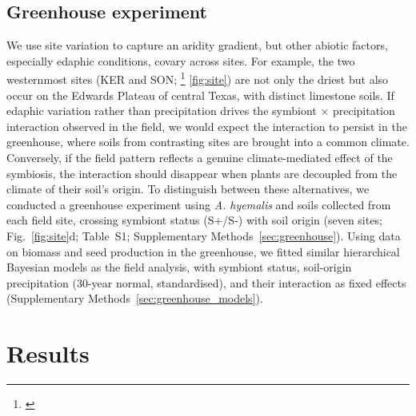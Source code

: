 \documentclass[12pt]{article}\usepackage[]{graphicx}\usepackage[dvipsnames]{xcolor}
\newcommand{\tom}[2]{{\color{red}{#1}}\footnote{\textit{\color{red}{#2}}}}
\begin{document}
\subsection*{Greenhouse experiment}
We use site variation to capture an aridity gradient, but other abiotic factors, especially edaphic conditions, covary across sites. 
For example, the two westernmost sites (KER and SON; \tom{Figure}{Sometimes you spell this out and sometimes it is Fig.} \ref{fig:site}) are not only the driest but also occur on the Edwards Plateau of central Texas, with distinct limestone soils.
If edaphic variation rather than precipitation drives the symbiont $\times$ precipitation interaction observed in the field, we would expect the interaction to persist in the greenhouse, where soils from contrasting sites are brought into a common climate. 
Conversely, if the field pattern reflects a genuine climate-mediated effect of the symbiosis, the interaction should disappear when plants are decoupled from the climate of their soil's origin. 
To distinguish between these alternatives, we conducted a greenhouse experiment using \textit{A. hyemalis} and soils collected from each field site, crossing symbiont status (S+/S-) with soil origin (seven sites; Fig.~\ref{fig:site}d; 
Table~S1; Supplementary Methods~\ref{sec:greenhouse}).
Using data on biomass and seed production in the greenhouse, we fitted similar hierarchical Bayesian models as the field analysis, with symbiont status, soil-origin precipitation (30-year normal, standardised), and their interaction as fixed effects (Supplementary Methods~\ref{sec:greenhouse_models}).

\section*{Results}
\end{document}
